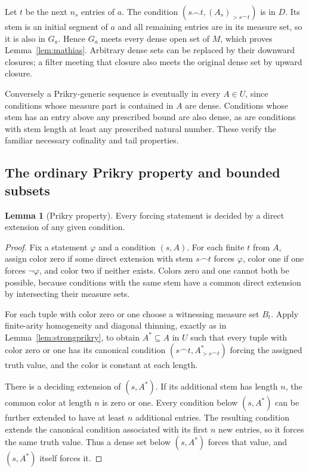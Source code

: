\documentclass[11pt,letterpaper]{article}
\theoremstyle{definition}
\newtheorem{lemma}[definition]{Lemma}
\numberwithin{equation}{section}
\newcommand{\suff}{\mathbin{\smallfrown}}
\begin{document}
Let $t$ be the next $n_s$ entries of $a$. The condition
$(s\suff t,(A_s)_{>s\suff t})$ is in $D$. Its stem is an initial
segment of $a$ and all remaining entries are in its measure set,
so it is also in $G_a$. Hence $G_a$ meets every dense open set of $M$,
which proves Lemma~\ref{lem:mathias}. Arbitrary dense sets can be
replaced by their downward closures; a filter meeting that closure
also meets the original dense set by upward closure.

Conversely a Prikry-generic sequence is eventually in every
$A\in U$, since conditions whose measure part is contained in $A$
are dense. Conditions whose stem has an entry above any prescribed
bound are also dense, as are conditions with stem length at least
any prescribed natural number. These verify the familiar necessary
cofinality and tail properties.

\subsection{The ordinary Prikry property and bounded subsets}

\begin{lemma}[Prikry property]\label{lem:prikryproperty}
Every forcing statement is decided by a direct extension of any
given condition.
\end{lemma}

\begin{proof}
Fix a statement $\varphi$ and a condition $(s,A)$.
For each finite $t$ from $A$, assign color zero if some direct
extension with stem $s\suff t$ forces $\varphi$, color one if one
forces $\neg\varphi$, and color two if neither exists.
Colors zero and one cannot both be possible, because conditions with
the same stem have a common direct extension by intersecting their
measure sets.

For each tuple with color zero or one choose a witnessing measure
set $B_t$. Apply finite-arity homogeneity and diagonal thinning,
exactly as in Lemma~\ref{lem:strongprikry}, to obtain $A^*\subseteq A$
in $U$ such that every tuple with color zero or one has its
canonical condition $(s\suff t,A^*_{>s\suff t})$ forcing the assigned
truth value, and the color is constant at each length.

There is a deciding extension of $(s,A^*)$. If its additional stem
has length $n$, the common color at length $n$ is zero or one.
Every condition below $(s,A^*)$ can be further extended to have at
least $n$ additional entries. The resulting condition extends the
canonical condition associated with its first $n$ new entries, so
it forces the same truth value. Thus a dense set below
$(s,A^*)$ forces that value, and $(s,A^*)$ itself forces it.
\end{proof}
\end{document}
